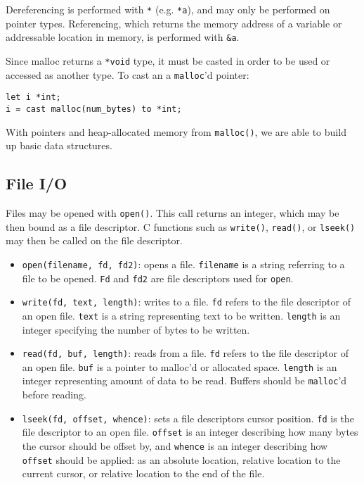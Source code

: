 		\smallskip\noindent
		Dereferencing is performed with \texttt{*} (e.g. \verb|*a|), and may only be performed on pointer types. Referencing, which returns the memory address of a variable or addressable location in memory, is performed with \verb|&a|.

		\medskip\noindent
		Since malloc returns a \texttt{*void} type, it must be casted in order to be used or accessed as another type. To cast an a \texttt{malloc}'d pointer:
		\begin{lstlisting}
let i *int;
i = cast malloc(num_bytes) to *int;
		\end{lstlisting}

		\noindent
		With pointers and heap-allocated memory from \texttt{malloc()}, we are able to build up basic data structures. 

	\subsection{File I/O}
		Files may be opened with \texttt{open()}. This call returns an integer, which may be then bound as a file descriptor. C functions such as \texttt{write()}, \texttt{read()}, or \texttt{lseek()} may then be called on the file descriptor. 

		\begin{itemize}
			\item \texttt{open(filename, fd, fd2)}: opens a file. \texttt{filename} is a string referring to a file to be opened. \texttt{Fd} and \texttt{fd2} are file descriptors used for \texttt{open}.
			\item \texttt{write(fd, text, length)}: writes to a file. \texttt{fd} refers to the file descriptor of an open file. \texttt{text} is a string representing text to be written. \texttt{length} is an integer specifying the number of bytes to be written.
			\item \texttt{read(fd, buf, length)}: reads from a file. \texttt{fd} refers to the file descriptor of an open file. \texttt{buf} is a pointer to malloc'd or allocated space. \texttt{length} is an integer representing amount of data to be read. Buffers should be \texttt{malloc}'d before reading. 
			\item \texttt{lseek(fd, offset, whence)}: sets a file descriptors cursor position. \texttt{fd} is the file descriptor to an open file. \texttt{offset} is an integer describing how many bytes the cursor should be offset by, and \texttt{whence} is an integer describing how \texttt{offset} should be applied: as an absolute location, relative location to the current cursor, or relative location to the end of the file.
		\end{itemize}

